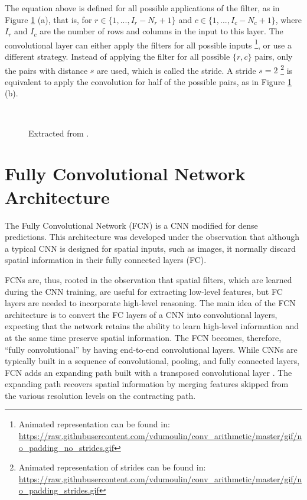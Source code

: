 The equation above is defined for all possible applications of the filter, as in Figure \ref{fig:convop} (a), that is, for
$r \in \{1, ..., I_{r} - N_{r} + 1\}$ and $c \in \{1, ..., I_{c} - N_{c} + 1\}$, where $I_{r}$ and $I_{c}$ are the number of rows and columns in the input to this layer. The convolutional layer can either apply the filters for all possible inputs \footnote{Animated representation can be found in: \url{https://raw.githubusercontent.com/vdumoulin/conv_arithmetic/master/gif/no_padding_no_strides.gif}}, or use a different strategy. Instead of applying the filter for all possible $\{r, c\}$ pairs, only the pairs with distance
$s$ are used, which is called the stride. A stride $s = 2$ \footnote{Animated representation of strides can be found in: \url{https://raw.githubusercontent.com/vdumoulin/conv_arithmetic/master/gif/no_padding_strides.gif}} is equivalent to apply the convolution for half of the possible pairs, as in Figure \ref{fig:convop} (b).

\begin{figure}[!htb]
\centering
{}
\\


\caption{Extracted from \cite{dumoulin2016guide}.} \label{fig:convop}
\end{figure}


\section{Fully Convolutional Network Architecture}

The Fully Convolutional Network (FCN) \cite{long2015fully} is a CNN modified for dense
predictions. This architecture was developed under the observation that although a typical CNN is designed for spatial inputs, such as images, it normally discard spatial information in their fully connected layers (FC). 

FCNs are, thus, rooted in the observation that spatial filters, which are learned during the CNN training, are useful for extracting low-level features, but FC layers are needed to incorporate high-level reasoning. The main idea of the FCN architecture is to convert the FC layers of a CNN into convolutional layers, expecting that the network retains the ability to learn high-level information and at the same time preserve spatial information. The FCN becomes, therefore, ``fully convolutional'' by having end-to-end convolutional layers. While CNNs are typically built in a sequence of convolutional, pooling, and fully connected layers, FCN adds an expanding path built with a transposed convolutional layer \cite{long2015fully}. The expanding path recovers spatial information by merging features skipped from the various resolution levels on the contracting path.


